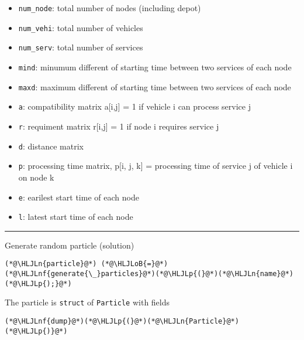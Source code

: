 \documentclass[12pt,a4paper]{article}
\newcommand{\HLJLn}[1]{#1}
\newcommand{\HLJLnf}[1]{\textcolor[RGB]{66,102,213}{#1}}
\newcommand{\HLJLoB}[1]{\textcolor[RGB]{102,102,102}{\textbf{#1}}}
\newcommand{\HLJLp}[1]{#1}
\begin{document}
\begin{itemize}
\item \texttt{num\_node}: total number of nodes (including depot)


\item \texttt{num\_vehi}: total number of vehicles


\item \texttt{num\_serv}: total number of services


\item \texttt{mind}:     minumum different of starting time between two services of each node


\item \texttt{maxd}:     maximum different of starting time between two services of each node


\item \texttt{a}:        compatibility matrix a[i,j] = 1 if vehicle i can process service j


\item \texttt{r}:        requiment matrix r[i,j] = 1 if node i requires service j


\item \texttt{d}:        distance matrix


\item \texttt{p}:        processing time matrix, p[i, j, k] = processing time of service j of vehicle i on node k


\item \texttt{e}:        earilest start time of each node


\item \texttt{l}:        latest start time of each node

\end{itemize}
\rule{\textwidth}{1pt}
Generate random particle (solution)


\begin{lstlisting}
(*@\HLJLn{particle}@*) (*@\HLJLoB{=}@*) (*@\HLJLnf{generate{\_}particles}@*)(*@\HLJLp{(}@*)(*@\HLJLn{name}@*)(*@\HLJLp{);}@*)
\end{lstlisting}


The particle is \texttt{struct} of \texttt{Particle} with fields


\begin{lstlisting}
(*@\HLJLnf{dump}@*)(*@\HLJLp{(}@*)(*@\HLJLn{Particle}@*)(*@\HLJLp{)}@*)
\end{lstlisting}
\end{document}
